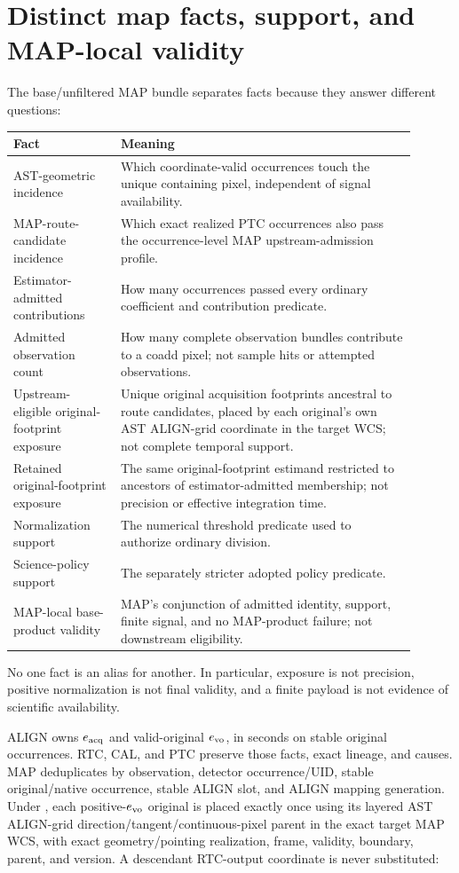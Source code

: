 \documentclass[10pt]{article}
\begin{document}
\clearpage
\section{Distinct map facts, support, and MAP-local validity}

The base/unfiltered MAP bundle separates facts because they answer different questions:

\begin{longtable}{L{0.24\linewidth}L{0.66\linewidth}}
\toprule
Fact & Meaning\\
\midrule
AST-geometric incidence & Which coordinate-valid occurrences touch the unique
containing pixel, independent of signal availability.\\
MAP-route-candidate incidence & Which exact realized PTC occurrences also pass
the occurrence-level MAP upstream-admission profile.\\
Estimator-admitted contributions & How many occurrences passed every ordinary
coefficient and contribution predicate.\\
Admitted observation count & How many complete observation bundles contribute
to a coadd pixel; not sample hits or attempted observations.\\
Upstream-eligible original-footprint exposure & Unique original acquisition
footprints ancestral to route candidates, placed by each original's own AST
ALIGN-grid coordinate in the target WCS; not complete temporal support.\\
Retained original-footprint exposure & The same original-footprint estimand
restricted to ancestors of estimator-admitted membership; not precision or
effective integration time.\\
Normalization support & The numerical threshold predicate used to authorize
ordinary division.\\
Science-policy support & The separately stricter adopted policy predicate.\\
MAP-local base-product validity & MAP's conjunction of admitted identity,
support, finite signal, and no MAP-product failure; not downstream eligibility.\\
\bottomrule
\end{longtable}

No one fact is an alias for another. In particular, exposure is not precision,
positive normalization is not final validity, and a finite payload is not
evidence of scientific availability.

ALIGN owns \(e_{\rm acq}\) and valid-original \(e_{\rm vo}\), in seconds on
stable original occurrences. RTC, CAL, and PTC preserve those facts, exact
lineage, and causes. MAP deduplicates by observation, detector occurrence/UID,
stable original/native occurrence, stable ALIGN slot, and ALIGN mapping
generation. Under
\SCIMapASTFootprintBoundaryId, each
positive-\(e_{\rm vo}\) original is placed exactly once using its layered AST
ALIGN-grid direction/tangent/continuous-pixel parent in the exact target MAP
WCS, with exact geometry/pointing realization, frame, validity, boundary,
parent, and version. A descendant RTC-output coordinate is never substituted:
\end{document}
